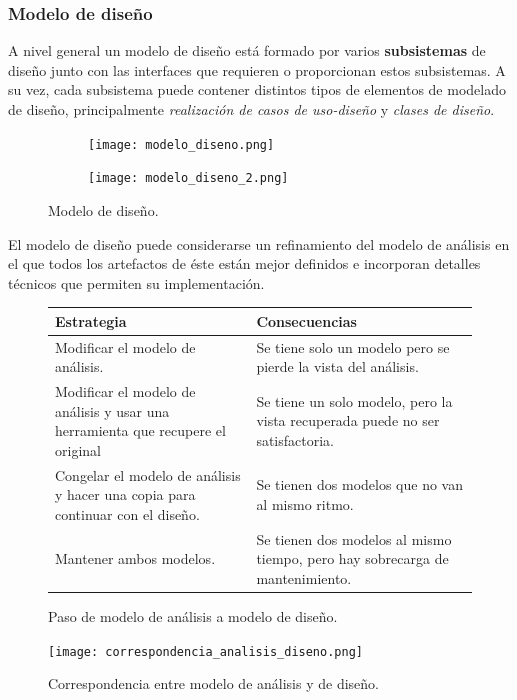 \documentclass[12pt,spanish]{article}
\begin{document}
\subsubsection{Modelo de diseño}


A nivel general un modelo de diseño está formado por varios \textbf{subsistemas} de diseño junto con las interfaces que requieren o proporcionan estos subsistemas. A su vez, cada subsistema puede contener distintos tipos de elementos de modelado de diseño, principalmente \emph{realización de casos de uso-diseño} y \emph{clases de diseño}.


\begin{figure}[H]
\centering
\begin{subfigure}[b]{0.5\textwidth}
\texttt{[image: modelo\_diseno.png]}
\end{subfigure}
\quad
\begin{subfigure}[b]{0.45\textwidth}
\texttt{[image: modelo\_diseno\_2.png]}
\end{subfigure}
\caption{Modelo de diseño.}
\end{figure}

El modelo de diseño puede considerarse un refinamiento del modelo de análisis en el que todos los artefactos de éste están mejor definidos e incorporan detalles técnicos que permiten su implementación.

\begin{figure}[H]
\centering
\begin{tabular}{|m{7cm}|m{7cm}|}
\hline
\textbf{Estrategia} & \textbf{Consecuencias}\\
\hline
Modificar el modelo de análisis. & Se tiene solo un modelo pero se pierde la vista del análisis.\\
\hline
Modificar el modelo de análisis y usar una herramienta que recupere el original & Se tiene un solo modelo, pero la vista recuperada puede no ser satisfactoria.\\
\hline
Congelar el modelo de análisis y hacer una copia para continuar con el diseño. & Se tienen dos modelos que no van al mismo ritmo.\\
\hline
Mantener ambos modelos. & Se tienen dos modelos al mismo tiempo, pero hay sobrecarga de mantenimiento.\\
\hline
\end{tabular}
\caption{Paso de modelo de análisis a modelo de diseño.}
\end{figure}

\begin{figure}[H]
\centering
\texttt{[image: correspondencia\_analisis\_diseno.png]}
\caption{Correspondencia entre modelo de análisis y de diseño.}
\end{figure}
\end{document}
